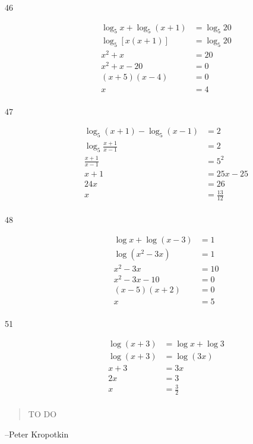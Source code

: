\documentclass{exam}
\begin{document}
\begin{description}
      \item[46] 
        \begin{align*}
          \log_5 x + \log_5(x + 1) &= \log_5 20 \\
          \log_5 [x(x + 1)]        &= \log_5 20 \\
          x^2 + x                  &= 20 \\
          x^2 + x - 20             &= 0 \\
          (x + 5)(x - 4)           &= 0 \\
          x                        &= \boxed{4} \\
        \end{align*}

      \item[47] 
        \begin{align*}
          \log_5 (x + 1) - \log_5 (x - 1) &= 2 \\
          \log_5 \frac{x + 1}{x - 1}      &= 2 \\
          \frac{x + 1}{x - 1}             &= 5^2 \\
          x + 1                           &= 25x - 25 \\
          24x                             &= 26 \\
          x                               &= \boxed{\frac{13}{12}} \\
        \end{align*}

      \item[48] 
        \begin{align*}
          \log x + \log (x - 3)        &= 1 \\
          \log \left( x^2 - 3x \right) &= 1 \\
          x^2 - 3x                     &= 10 \\
          x^2 - 3x - 10                &= 0 \\
          (x - 5)(x + 2)               &= 0 \\
          x                            &= \boxed{5} \\
        \end{align*}

      \item[51] 
        \begin{align*}
          \log (x + 3) &= \log x + \log 3 \\
          \log (x + 3) &= \log (3x) \\
           x + 3       &= 3x \\
           2x          &= 3 \\
           x           &= \boxed{\frac{3}{2}} \\
        \end{align*}

    \end{description}

  \else
    \vspace{5 cm}
    \begin{quote}
      \begin{em}
        TO DO
      \end{em}
    \end{quote}

    \hspace{1 cm} --Peter Kropotkin
  \fi
\end{document}
